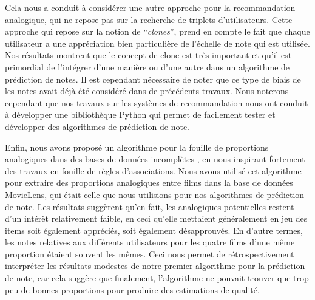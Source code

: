 Cela nous a conduit à considérer une autre approche pour la recommandation
analogique, qui ne repose pas sur la recherche de triplets d'utilisateurs.
Cette approche \cite{HugPraRicSerFuzzIEEE16} qui repose sur la notion de
``\textit{clones}'', prend en compte le fait que chaque utilisateur a une
appréciation bien particulière de l'échelle de note qui est utilisée. Nos
résultats montrent que le concept de clone est très important et qu'il est
primordial de l'intégrer d'une manière ou d'une autre dans un algorithme de
prédiction de notes. Il est cependant nécessaire de noter que ce type de biais
de les notes avait déjà été considéré dans de précédents travaux. Nous noterons
cependant que nos travaux sur les systèmes de recommandation nous ont conduit à
développer une bibliothèque Python \cite{Surprise} qui permet de facilement
tester et développer des algorithmes de prédiction de note.

Enfin, nous avons proposé un algorithme pour la fouille de proportions
analogiques dans des bases de données incomplètes \cite{HugPraRicSerLFA16}, en
nous inspirant fortement des travaux en fouille de règles d'associations. Nous
avons utilisé cet algorithme pour extraire des proportions analogiques entre
films dans la base de données MovieLens, qui était celle que nous utilisions
pour nos algorithmes de prédiction de note. Les résultats suggèrent qu'en fait,
les analogiques potentielles restent d'un intérêt relativement faible, en ceci
qu'elle mettaient généralement en jeu des items soit également appréciés, soit
également désapprouvés. En d'autre termes, les notes relatives aux différents
utilisateurs pour les quatre films d'une même proportion étaient souvent les
mêmes. Ceci nous permet de rétrospectivement interpréter les résultats modestes
de notre premier algorithme pour la prédiction de note, car cela suggère que
finalement, l'algorithme ne pouvait trouver que trop peu de bonnes proportions
pour produire des estimations de qualité.\\


